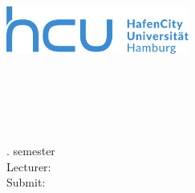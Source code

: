 \begin{titlepage}
	\thispagestyle{empty}
	
	\begin{minipage}[t]{0.4\textwidth}
		\vspace{0pt}
		\includegraphics[width=60mm]{Data/hcu_logo.pdf}
	\end{minipage}
	\hfill
	\begin{minipage}[t]{0.5\textwidth}
		\vspace{0pt}
		\begin{flushright}
			\textbf{\underline{\Groupname}}\\
			\Names
		\end{flushright}
	\end{minipage}
	
	\vfill
	
	\begin {center}
	\Large \Type
	\end {center}
	\begin {center}
	\huge \Title
	\end {center}
	
	\vfill
	
	\begin{flushleft}
		\Event\\
		\Semester \\
		\Study\\
		\SubjectSemester. semester\\
		\vspace{10pt}
		Lecturer: \\ 
		\Lecturer
		\vspace{30pt}
		Submit: \dateofsubmission
	\end{flushleft}
	
\end{titlepage}